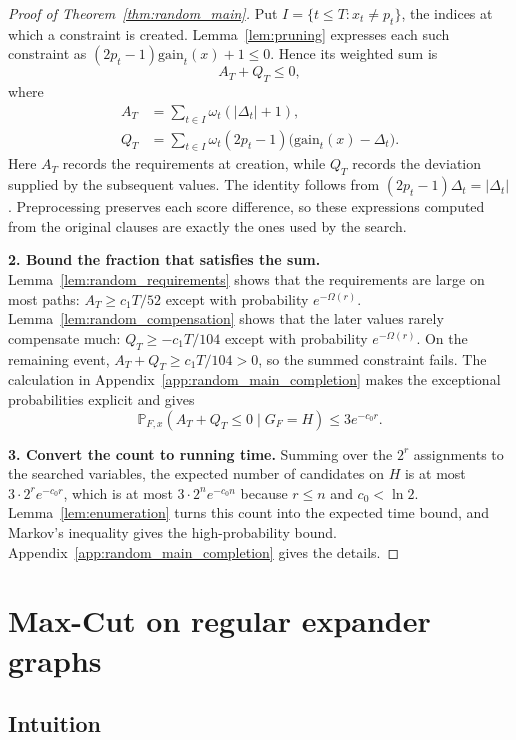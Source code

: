 \documentclass[11pt,a4paper]{article}
\theoremstyle{definition}
\theoremstyle{remark}
\newcommand{\Prb}{\mathbb P}
\begin{document}
\begin{proof}[Proof of Theorem~\ref{thm:random_main}]
Put $I=\{t\le T:x_t\ne p_t\}$, the indices at which a constraint is
created. Lemma~\ref{lem:pruning} expresses each such constraint as
$(2p_t-1)\mathrm{gain}_t(x)+1\le0$. Hence its weighted sum is
\begin{equation}
 A_T+Q_T\le0,
 \label{eq:random_sum}
\end{equation}
where
\begin{align*}
 A_T&=\sum_{t\in I}\omega_t(|\Delta_t|+1),\\
 Q_T&=\sum_{t\in I}\omega_t(2p_t-1)
                       \bigl(\mathrm{gain}_t(x)-\Delta_t\bigr).
\end{align*}
Here $A_T$ records the requirements at creation, while $Q_T$ records the
deviation supplied by the subsequent values. The identity follows from
$(2p_t-1)\Delta_t=|\Delta_t|$.
Preprocessing preserves each score difference, so these expressions
computed from the original clauses are exactly the ones used by the search.

\par\medskip\noindent\textbf{2. Bound the fraction that satisfies the sum.}
Lemma~\ref{lem:random_requirements} shows that the requirements are
large on most paths: $A_T\ge c_1T/52$ except with probability
$e^{-\Omega(r)}$. Lemma~\ref{lem:random_compensation} shows that the
later values rarely compensate much: $Q_T\ge-c_1T/104$ except with
probability $e^{-\Omega(r)}$. On the remaining event,
$A_T+Q_T\ge c_1T/104>0$, so the summed constraint fails. The calculation
in Appendix~\ref{app:random_main_completion} makes the exceptional
probabilities explicit and gives
\[
 \Prb_{F,x}(A_T+Q_T\le0\mid G_F=H)\le3e^{-c_0r}.
\]

\par\medskip\noindent\textbf{3. Convert the count to running time.}
Summing over the $2^r$ assignments to the searched variables, the
expected number of candidates on $H$ is at most $3\cdot2^re^{-c_0r}$,
which is at most $3\cdot2^ne^{-c_0n}$ because $r\le n$ and $c_0<\ln2$.
Lemma~\ref{lem:enumeration} turns this count into the expected time bound,
and Markov's inequality gives the high-probability bound.
Appendix~\ref{app:random_main_completion} gives the details.
\end{proof}


\section{Max-Cut on regular expander graphs}\label{sec:maxcut}

\subsection{Intuition}\label{sec:maxcut_intuition}
\end{document}
